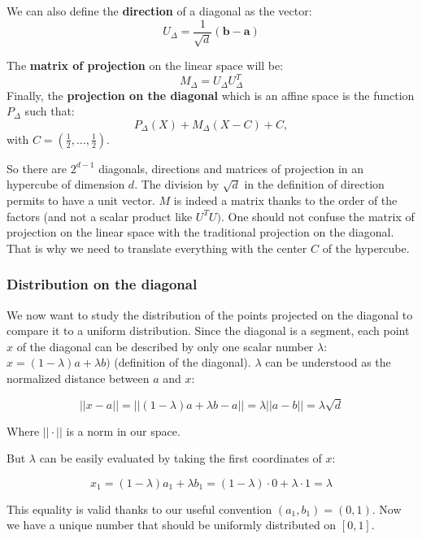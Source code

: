 \begin{definition}
	We can also define the \textbf{direction} of a diagonal as the vector:
	\begin{equation*}
		U_{\Delta}=\frac{1}{\sqrt{d}}(\boldsymbol{b}-\boldsymbol{a})
	\end{equation*}
\end{definition}

\begin{definition}\label{matrix}
	The \textbf{matrix of projection} on the linear space will be:
	\begin{equation*}
		M_{\Delta}=U_{\Delta}U_{\Delta}^{T}
	\end{equation*}
	Finally, the \textbf{projection on the diagonal} which is an affine space is the function $P_{\Delta}$ such that:
	\begin{equation*}
		P_{\Delta}(X)+M_{\Delta}(X-C)+C,
	\end{equation*}
	with $C=(\frac{1}{2},\dots,\frac{1}{2})$.
\end{definition}

\begin{remark}
	So there are $2^{d-1}$ diagonals, directions and matrices of projection in an hypercube of dimension $d$. The division by $\sqrt{d}$ in the definition of direction permits to have a unit vector. $M$ is indeed a matrix thanks to the order of the factors (and not a scalar product like $U^{T}U)$. One should not confuse the matrix of projection on the linear space with the traditional projection on the diagonal. That is why we need to translate everything with the center $C$ of the hypercube.
\end{remark}

\subsubsection{Distribution on the diagonal}

We now want to study the distribution of the points projected on the diagonal to compare it to a uniform distribution. Since the diagonal is a segment, each point $x$ of the diagonal can be described by only one scalar number $\lambda$: $x=(1-\lambda)a+\lambda b)$ (definition of the diagonal). $\lambda$ can be understood as the normalized distance between $a$ and $x$:

\begin{equation*}	
	||x-a||=||(1-\lambda) a + \lambda b-a||= \lambda ||a-b|| = \lambda \sqrt{d}
\end{equation*}

Where $||\cdot||$ is a norm in our space.

But $\lambda$ can be easily evaluated by taking the first coordinates of $x$:

\begin{equation*}
	x_{1}=(1-\lambda)a_{1}+\lambda b_{1}=(1-\lambda)\cdot 0 + \lambda \cdot 1=\lambda
\end{equation*}

This equality is valid thanks to our useful convention $(a_{1},b_{1})=(0,1)$. Now we have a unique number that should be uniformly distributed on $[0,1]$.